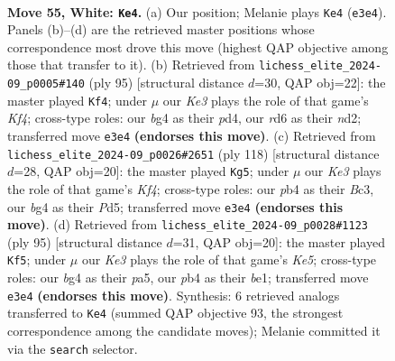 \documentclass[11pt]{article}
\begin{document}
\clearpage

\begin{figure}[p]\centering
\begin{subfigure}{0.46\textwidth}\centering
\resizebox{\linewidth}{!}{%
\newchessgame
\chessboard[
  setfen={8/7p/3r1k2/4p3/1p4b1/4K3/4n1r1/8 w - - 0 55},
  showmover=false,
  pgfstyle=straightmove, color=movearrow, markmove={e3-e4}
]}
\caption{}
\end{subfigure}\hfill
\begin{subfigure}{0.46\textwidth}\centering
\resizebox{\linewidth}{!}{%
\newchessgame
\chessboard[
  setfen={8/8/8/R3Nk1p/3P3P/2n5/3N1P2/5K2 b - - 0 48},
  showmover=false,
  pgfstyle=straightmove, color=movearrow, markmove={f5-f4}
]}
\caption{}
\end{subfigure}
\\[4pt]
\begin{subfigure}{0.46\textwidth}\centering
\resizebox{\linewidth}{!}{%
\newchessgame
\chessboard[
  setfen={5rk1/1R6/6p1/3P1n2/5K2/2B5/8/8 w - - 11 60},
  showmover=false,
  pgfstyle=straightmove, color=movearrow, markmove={f4-g5}
]}
\caption{}
\end{subfigure}\hfill
\begin{subfigure}{0.46\textwidth}\centering
\resizebox{\linewidth}{!}{%
\newchessgame
\chessboard[
  setfen={8/4R3/8/P3N3/4k3/8/8/3KB3 b - - 2 48},
  showmover=false,
  pgfstyle=straightmove, color=movearrow, markmove={e4-f5}
]}
\caption{}
\end{subfigure}
\caption{\textbf{Move 55, White: \texttt{Ke4}.} (a) Our position; Melanie plays \texttt{Ke4} (\texttt{e3e4}). Panels (b)--(d) are the retrieved master positions whose correspondence most drove this move (highest QAP objective among those that transfer to it). (b) Retrieved from \texttt{lichess\_elite\_2024-09\_p0005\#140} (ply 95) [structural distance $d$=30, QAP obj=22]: the master played \texttt{Kf4}; under $\mu$ our \emph{Ke3} plays the role of that game's \emph{Kf4}; cross-type roles: our \emph{b}g4 as their \emph{p}d4, our \emph{r}d6 as their \emph{n}d2; transferred move \texttt{e3e4} \textbf{(endorses this move)}. (c) Retrieved from \texttt{lichess\_elite\_2024-09\_p0026\#2651} (ply 118) [structural distance $d$=28, QAP obj=20]: the master played \texttt{Kg5}; under $\mu$ our \emph{Ke3} plays the role of that game's \emph{Kf4}; cross-type roles: our \emph{p}b4 as their \emph{B}c3, our \emph{b}g4 as their \emph{P}d5; transferred move \texttt{e3e4} \textbf{(endorses this move)}. (d) Retrieved from \texttt{lichess\_elite\_2024-09\_p0028\#1123} (ply 95) [structural distance $d$=31, QAP obj=20]: the master played \texttt{Kf5}; under $\mu$ our \emph{Ke3} plays the role of that game's \emph{Ke5}; cross-type roles: our \emph{b}g4 as their \emph{p}a5, our \emph{p}b4 as their \emph{b}e1; transferred move \texttt{e3e4} \textbf{(endorses this move)}. Synthesis: 6 retrieved analogs transferred to \texttt{Ke4} (summed QAP objective 93, the strongest correspondence among the candidate moves); Melanie committed it via the \texttt{search} selector.}
\label{fig:thought-m108}
\end{figure}
\end{document}
